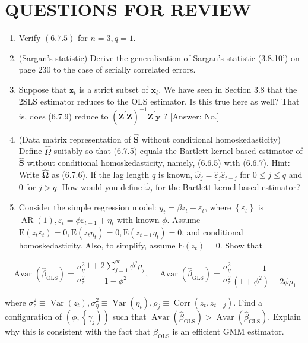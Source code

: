 \documentclass[10pt]{article}
\begin{document}
\section*{QUESTIONS FOR REVIEW}
\begin{enumerate}
  \item Verify $(6.7 .5)$ for $n=3, q=1$.
  \item (Sargan's statistic) Derive the generalization of Sargan's statistic (3.8.10') on page 230 to the case of serially correlated errors.
  \item Suppose that $\mathbf{z}_{t}$ is a strict subset of $\mathbf{x}_{t}$. We have seen in Section 3.8 that the 2SLS estimator reduces to the OLS estimator. Is this true here as well? That is, does (6.7.9) reduce to $\left(\mathbf{Z}^{\prime} \mathbf{Z}\right)^{-1} \mathbf{Z}^{\prime} \mathbf{y}$ ? [Answer: No.]
  \item (Data matrix representation of $\widehat{\mathbf{S}}$ without conditional homoskedasticity) Define $\widehat{\Omega}$ suitably so that (6.7.5) equals the Bartlett kernel-based estimator of $\widehat{\mathbf{S}}$ without conditional homoskedasticity, namely, (6.6.5) with (6.6.7). Hint: Write $\widehat{\boldsymbol{\Omega}}$ as (6.7.6). If the lag length $q$ is known, $\hat{\omega}_{j}=\hat{\varepsilon}_{j} \hat{\varepsilon}_{t-j}$ for $0 \leq j \leq q$ and 0 for $j>q$. How would you define $\hat{\omega}_{j}$ for the Bartlett kernel-based estimator?
  \item Consider the simple regression model: $y_{t}=\beta z_{t}+\varepsilon_{t}$, where $\left\{\varepsilon_{t}\right\}$ is $\operatorname{AR}(1), \varepsilon_{t}= \phi \varepsilon_{t-1}+\eta_{t}$ with known $\phi$. Assume $\mathrm{E}\left(z_{t} \varepsilon_{t}\right)=0, \mathrm{E}\left(z_{t} \eta_{t}\right)=0, \mathrm{E}\left(z_{t-1} \eta_{t}\right)=0$, and conditional homoskedasticity. Also, to simplify, assume $\mathrm{E}\left(z_{t}\right)=0$. Show that
\end{enumerate}

$$
\operatorname{Avar}\left(\widehat{\beta}_{\mathrm{OLS}}\right)=\frac{\sigma_{\eta}^{2}}{\sigma_{z}^{2}} \frac{1+2 \sum_{j=1}^{\infty} \phi^{j} \rho_{j}}{1-\phi^{2}}, \quad \operatorname{Avar}\left(\widehat{\beta}_{\mathrm{GLS}}\right)=\frac{\sigma_{\eta}^{2}}{\sigma_{z}^{2}} \frac{1}{\left(1+\phi^{2}\right)-2 \phi \rho_{1}}
$$

where $\sigma_{z}^{2} \equiv \operatorname{Var}\left(z_{t}\right), \sigma_{\eta}^{2} \equiv \operatorname{Var}\left(\eta_{t}\right), \rho_{j} \equiv \operatorname{Corr}\left(z_{t}, z_{t-j}\right)$. Find a configuration of $\left(\phi,\left\{\gamma_{j}\right)\right)$ such that $\operatorname{Avar}\left(\widehat{\beta}_{\mathrm{OLS}}\right)>\operatorname{Avar}\left(\widehat{\beta}_{\mathrm{GLS}}\right)$. Explain why this is consistent with the fact that $\beta_{\mathrm{OLS}}$ is an efficient GMM estimator.
\end{document}
